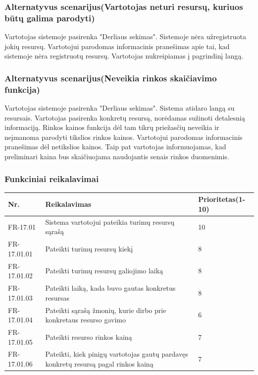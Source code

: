 \documentclass[oneside]{VUMIFPSkursinis}
\begin{document}
	\subsubsection{Alternatyvus scenarijus(Vartotojas neturi resursų, kuriuos būtų galima parodyti)}
	Vartotojas sistemoje pasirenka "Derliaus sekimas". Sistemoje nėra užregistruota jokių resursų. Vartotojui parodomas informacinis pranešimas apie tai, kad sistemoje nėra registruotų resursų. Vartotojas nukreipiamas į pagrindinį langą.
	\subsubsection{Alternatyvus scenarijus(Neveikia rinkos skaičiavimo funkcija)}
	Vartotojas sistemoje pasirenka "Derliaus sekimas". Sistema atidaro langą su resursais. Vartotojas pasirenka konkretų resursą, norėdamas sužinoti detalesnią informaciją. Rinkos kainos funkcija dėl tam tikrų priežasčių neveikia ir neįmanoma parodyti tikslios rinkos kainos. Vartotojui parodomas informacinis pranešimas dėl netikslios kainos. Taip pat vartotojas informuojamas, kad preliminari kaina bus skaičiuojama naudojantis senais rinkos duomenimis.
	\subsubsection{Funkciniai reikalavimai}
\begin{table}[htbp]
	\begin{tabularx}{1\textwidth}{ |P{2.5cm}|X|P{3cm }| }  \hline
		Nr. & Reikalavimas & Prioritetas(1-10) \\ \hline
		FR-17.01 & Sistema vartotojui pateikia turimų resursų sąrašą & 10 \\ \hline
		FR-17.01.01 & Pateikti turimų resursų kiekį & 8 \\ \hline
		FR-17.01.02 & Pateikti turimų resursų galiojimo laiką & 8 \\ \hline
		FR-17.01.03 & Pateikti laiką, kada buvo gautas konkretus resursas & 8 \\ \hline
		FR-17.01.04 & Pateikti sąrašą žmonių, kurie dirbo prie konkretaus resurso gavimo & 6 \\ \hline
		FR-17.01.05 & Pateikti resurso rinkos kainą & 7 \\ \hline 
		FR-17.01.06 & Pateikti, kiek pinigų vartotojas gautų pardavęs konkretų resursą pagal rinkos kainą & 7 \\ \hline
	\end{tabularx}
\end{table}	
	
\end{document}
